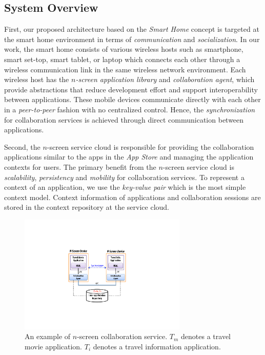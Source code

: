 \documentclass[conference]{IEEEtran}
\begin{document}
\subsection{System Overview}
First, our proposed architecture based on the \textit{Smart Home} concept is targeted at the smart home environment in terms of \textit{communication} and \textit{socialization}. 
In our work, the smart home consists of various wireless hosts such as smartphone, smart set-top, smart tablet, or laptop which connects each other through a wireless communication link in the same wireless network environment. Each wireless host has the \textit{$n$-screen application library} and \textit{collaboration agent}, which provide abstractions that reduce development effort and support interoperability between applications. These mobile devices communicate directly with each other in a \textit{peer-to-peer} fashion with no centralized control.  Hence, the \textit{synchronization} for collaboration services is achieved through direct communication between applications.

Second,  the $n$-screen service cloud is responsible for providing the collaboration applications similar to the apps in the \textit{App Store} and managing the application contexts  for users. 
The primary benefit from the $n$-screen service cloud is \textit{scalability}, \textit{persistency} and \textit{mobility} for collaboration services. 
To represent a context of an application, we use the \textit{key-value pair} which is the most simple context model. Context information of applications and collaboration sessions are stored in the context repository at the service cloud.

\begin{figure}[htb] %
\centering
\includegraphics[width=8cm,keepaspectratio]{basicmodel}
\caption{An example of $n$-screen collaboration service.  $T_m$ denotes a travel movie application. $T_i$ denotes a travel information application.}
\label{fig:basicmodel}
\end{figure}
\end{document}
